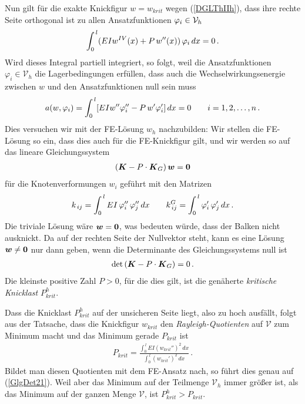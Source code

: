 Nun gilt f\"{u}r die exakte Knickfigur $w = w_{krit}$ wegen (\ref{DGLThIIh}), dass ihre
rechte Seite orthogonal ist zu allen Ansatzfunktionen $\varphi_i \in \mathcal{V}_h$
\begin{align}
\int_0^{\,l} (EI w^{IV}(x) + P \,w''(x))\,\varphi_i\,dx =  0\,.
\end{align}
Wird dieses Integral partiell integriert, so folgt, weil die Ansatzfunktionen $\varphi_i
\in \mathcal{V}_h$ die Lagerbedingungen erf\"{u}llen, dass auch die Wechselwirkungsenergie zwischen
$w$ und den Ansatzfunktionen null sein muss
\begin{align}\label{WeakKnickA21}
a(w,\varphi_i) = \int_0^{\,l}[ EI w'' \varphi_i'' - P \,w' \varphi_i'] \, dx = 0\qquad i =
1,2,\ldots,n\,.
\end{align}
Dies versuchen wir mit der FE-L\"{o}sung $w_h$ nachzubilden: Wir stellen die FE-L\"{o}sung so
ein, dass dies auch f\"{u}r die FE-Knickfigur gilt, und wir werden so auf das
lineare Gleichungssystem
\begin{align}
(\mbox{\boldmath $K$} - P \cdot \mbox{\boldmath $K$}_G)\,\mbox{\boldmath $w$} = \mbox{\boldmath $0$}
\end{align}
f\"{u}r die Knotenverformungen $w_i$ gef\"{u}hrt mit den Matrizen
\begin{align}
k_{\,ij} = \int_0^{\,l} EI\,\varphi_i''\,\varphi_j''\,dx \qquad k^G_{\,ij} = \int_0^{\,l}
\varphi_i'\,\varphi_j'\,dx\,.
\end{align}
Die triviale L\"{o}sung w\"{a}re $\mbox{\boldmath $w$} = \mbox{\boldmath $0$}$, was bedeuten w\"{u}rde, dass der Balken nicht
ausknickt. Da auf der rechten Seite der Nullvektor steht, kann es eine L\"{o}sung $\mbox{\boldmath $w$}
\neq \mbox{\boldmath $0$}$ nur dann geben, wenn die Determinante des Gleichungssystems null ist
\begin{align}\label{GlgDet21}
\det\,(\mbox{\boldmath $K$} - P\cdot\mbox{\boldmath $K$}_G)=0 \,.
\end{align}
Die kleinste positive Zahl $P > 0$, f\"{u}r die dies gilt, ist die gen\"{a}herte {\em
kritische Knicklast\/} $P_{krit}^h$.

Dass die Knicklast $P_{krit}^h$ auf der unsicheren Seite liegt, also zu hoch ausf\"{a}llt, folgt aus der Tatsache, dass die Knickfigur $w_{krit}$ den {\em Rayleigh-Quotienten} auf $\mathcal{V}$ zum Minimum macht und das Minimum gerade $P_{krit}$ ist
\begin{align}
P_{krit} = \frac{{\displaystyle \int_0^{\,l} EI (w_{krit}'')^2\,dx}}{ {\displaystyle
\int_0^{\,l} (w_{krit}')^2 \, dx} }\,.
\end{align}
Bildet man diesen Quotienten mit dem FE-Ansatz nach, so f\"{u}hrt dies genau auf
(\ref{GlgDet21}). Weil aber das Minimum auf der Teilmenge $\mathcal{V}_h$ immer gr\"{o}{\ss}er ist,
als das Minimum auf der ganzen Menge $\mathcal{V}$, ist $P_{krit}^{h} > P_{krit}$.

